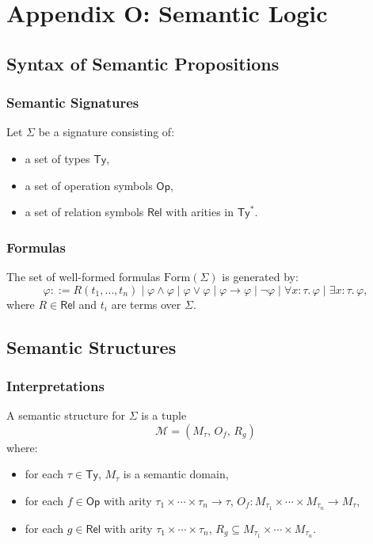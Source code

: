 \chapter*{Appendix O: Semantic Logic}

\section{Syntax of Semantic Propositions}

\subsection{Semantic Signatures}

Let $\Sigma$ be a signature consisting of:
\begin{itemize}
\item a set of types $\mathsf{Ty}$,
\item a set of operation symbols $\mathsf{Op}$,
\item a set of relation symbols $\mathsf{Rel}$ with arities in $\mathsf{Ty}^\ast$.
\end{itemize}

\subsection{Formulas}

The set of well-formed formulas $\mathrm{Form}(\Sigma)$ is generated by:
\[
\varphi ::= R(t_1,\dots,t_n) \mid \varphi\land\varphi \mid \varphi\lor\varphi \mid \varphi\to\varphi \mid \lnot \varphi \mid \forall x:\tau.\,\varphi \mid \exists x:\tau.\,\varphi,
\]
where $R\in\mathsf{Rel}$ and $t_i$ are terms over $\Sigma$.

\section{Semantic Structures}

\subsection{Interpretations}

A semantic structure for $\Sigma$ is a tuple
\[
\mathcal{M} = (M_\tau, \, O_f, \, R_g)
\]
where:
\begin{itemize}
\item for each $\tau\in\mathsf{Ty}$, $M_\tau$ is a semantic domain,
\item for each $f\in\mathsf{Op}$ with arity $\tau_1\times\cdots\times\tau_n\to\tau$,  
  $O_f : M_{\tau_1}\times\cdots\times M_{\tau_n}\to M_\tau$,
\item for each $g\in\mathsf{Rel}$ with arity $\tau_1\times\cdots\times\tau_n$,  
  $R_g \subseteq M_{\tau_1}\times\cdots\times M_{\tau_n}$.
\end{itemize}

